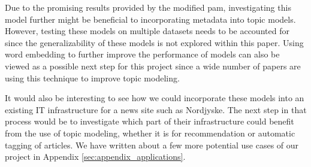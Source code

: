 Due to the promising results provided by the modified \gls{pam}, investigating this model further might be beneficial to incorporating metadata into topic models.
However, testing these models on multiple datasets needs to be accounted for since the generalizability of these models is not explored within this paper.
Using word embedding to further improve the performance of models can also be viewed as a possible next step for this project since a wide number of papers are using this technique to improve topic modeling\cite{MetaLDA2017}\cite{dieng2020topic}.

It would also be interesting to see how we could incorporate these models into an existing IT infrastructure for a news site such as Nordjyske.
The next step in that process would be to investigate which part of their infrastructure could benefit from the use of topic modeling, whether it is for recommendation or automatic tagging of articles. 
We have written about a few more potential use cases of our project in Appendix \autoref{sec:appendix_applications}. 
